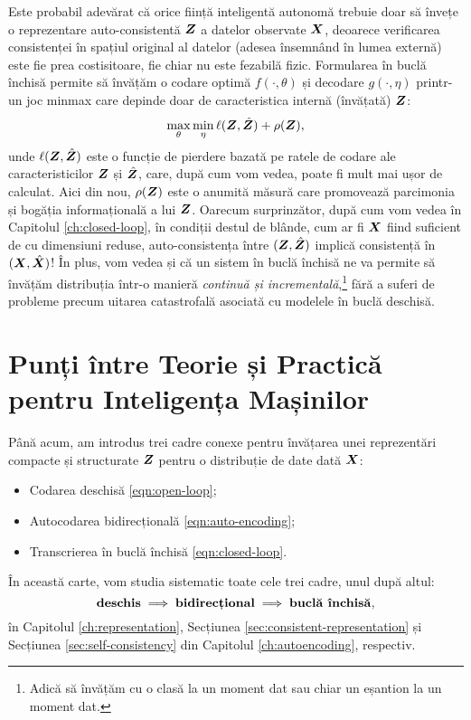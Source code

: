 \documentclass[../../book-main_ro.tex]{subfiles}
\begin{document}
Este probabil adevărat că orice ființă inteligentă autonomă trebuie doar să învețe o reprezentare auto-consistentă $\bm{Z}$ a datelor observate $\bm{X}$, deoarece verificarea consistenței în spațiul original al datelor (adesea însemnând în lumea externă) este fie prea costisitoare, fie chiar nu este fezabilă fizic. Formularea în buclă închisă permite să învățăm o codare optimă $f(\cdot, \theta)$ și decodare $g(\cdot, \eta)$ printr-un joc minmax care depinde doar de caracteristica internă (învățată) $\bm{Z}$:
\begin{equation}
\max_{\theta}\min_{\eta} \ell( \bm{Z}, \hat {\bm{Z}}) + \rho(\bm{Z}),
   \label{eqn:closed-loop-objective}
\end{equation}
unde $\ell( \bm{Z}, \hat {\bm{Z}})$ este o funcție de pierdere bazată pe ratele de codare ale caracteristicilor $\bm{Z}$ și $\hat {\bm{Z}}$, care, după cum vom vedea, poate fi mult mai ușor de calculat. Aici din nou, $\rho(\bm{Z})$ este o anumită măsură care promovează parcimonia și bogăția informațională a lui $\bm{Z}$. Oarecum surprinzător, după cum vom vedea în Capitolul \ref{ch:closed-loop}, în condiții destul de blânde, cum ar fi $\bm{X}$ fiind suficient de cu dimensiuni reduse, auto-consistența între $(\bm{Z}, \hat {\bm{Z}})$ implică consistență în $(\bm{X}, \hat {\bm{X}})$! În plus, vom vedea și că un sistem în buclă închisă ne va permite să învățăm distribuția într-o manieră {\em continuă și incrementală},\footnote{Adică să învățăm cu o clasă la un moment dat sau chiar un eșantion la un moment dat.} fără a suferi de probleme precum uitarea catastrofală asociată cu modelele în buclă deschisă.

\section{Punți între Teorie și Practică pentru Inteligența Mașinilor}
Până acum, am introdus trei cadre conexe pentru învățarea unei reprezentări compacte și structurate $\bm{Z}$ pentru o distribuție de date dată $\bm{X}$:
\begin{itemize}
\item Codarea deschisă \eqref{eqn:open-loop};
\item Autocodarea bidirecțională \eqref{eqn:auto-encoding};
\item Transcrierea în buclă închisă \eqref{eqn:closed-loop}.
\end{itemize}
În această carte, vom studia sistematic toate cele trei cadre, unul după altul:
\begin{equation}
    \mbox{\textbf{deschis}} \; \Longrightarrow \;
    \mbox{\textbf{bidirecțional}} \;  \Longrightarrow \; \mbox{\textbf{buclă închisă}},
\end{equation}
în Capitolul \ref{ch:representation}, Secțiunea \ref{sec:consistent-representation} și Secțiunea \ref{sec:self-consistency} din Capitolul \ref{ch:autoencoding}, respectiv.
\end{document}
